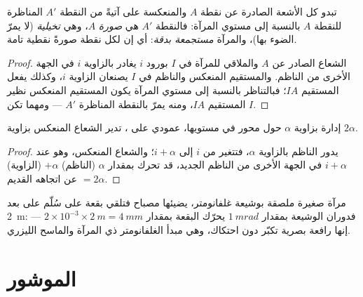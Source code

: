 \begin{proposition}\label{prop:b1:rays-reflection-refraction:mirror}
تبدو كل الأشعة الصادرة عن نقطة $A$ والمنعكسة على  آتيةً من
النقطة $A'$ المناظرة للنقطة $A$ بالنسبة إلى مستوي المرآة: فالنقطة $A'$
هي \emph{صورة} $A$، وهي \emph{تخيلية} (لا يمرّ الضوء بها)، والمرآة
\emph{مستجمعة بدقة}: أي إن لكل نقطة صورةً نقطية تامة.
\end{proposition}

\begin{proof}
الشعاع الصادر عن $A$ والملاقي للمرآة في $I$ بورود $i$ يغادر بالزاوية
$i$ في الجهة الأخرى من الناظم. والمستقيم المنعكس والناظم في $I$ يصنعان
الزاوية $i$، وكذلك يفعل المستقيم $IA$؛ فبالتناظر بالنسبة إلى مستوي
المرآة يكون المستقيم المنعكس نظير المستقيم $IA$، ومنه يمرّ بالنقطة
المناظرة $A'$ --- ومهما تكن $I$.
\end{proof}

\begin{proposition}\label{prop:b1:rays-reflection-refraction:rotation}
إدارة  بزاوية $\alpha$ حول محور في مستويها، عمودي على ، تدير الشعاع المنعكس بزاوية
$2\alpha$.
\end{proposition}

\begin{proof}
يدور الناظم بالزاوية $\alpha$، فتتغير  من $i$ إلى
$i + \alpha$؛ والشعاع المنعكس، وهو عند $i + \alpha$ في الجهة الأخرى من
الناظم الجديد، قد تحرك بمقدار $\alpha$ (الناظم) $+ \alpha$ (الزاوية) $=
2\alpha$ عن اتجاهه القديم.
\end{proof}

\begin{example}\label{ex:b1:rays-reflection-refraction:galvanometer}
مرآة صغيرة ملصقة بوشيعة غلفانومتر، يضيئها مصباح فتلقي بقعة على سُلّم
على بعد \qty{2}{m}: فدوران الوشيعة بمقدار
$\qty{1}{mrad}$ يحرّك البقعة بمقدار $2 \times 10^{-3} \times
\qty{2}{m} = \qty{4}{mm}$ --- إنها رافعة بصرية تكبّر دون
احتكاك، وهي مبدأ الغلفانومتر ذي المرآة والماسح الليزري.
\end{example}

\section{الموشور}

